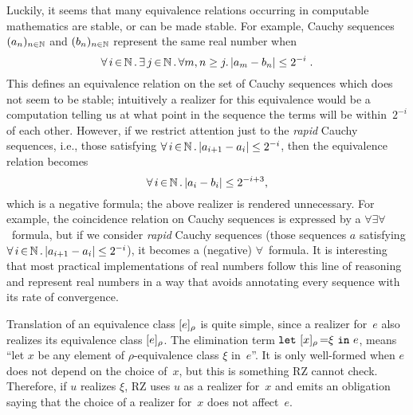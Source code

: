 Luckily, it seems that many equivalence relations occurring in
computable mathematics are stable, or can be made stable.
%
\iflong
For example, Cauchy sequences $(a_n)_{n\in\mathbb{N}}$
and $(b_n)_{n\in\mathbb{N}}$ represent the same real number when
%
\begin{equation}
  \label{eq:cauchy}%
  \xall{i}{\NN}{
    \xsome{j}{\NN}{
      \forall m,n \geq j.\,|a_m - b_n| \leq 2^{-i}
    }
  } \;.
\end{equation}
%
This defines an equivalence relation on the set of Cauchy sequences
which does not seem to be stable; intuitively a realizer for this
equivalence would be a computation telling us at what point
in the sequence the terms will be within~$2^{-i}$ of each other.
%
However, if we restrict attention just to the \emph{rapid} Cauchy
sequences, i.e., those satisfying $\forall\, i \,{\in}\, \mathbb{N}\,.\,|a_{i+1} - a_i| \leq
  2^{-i}$, then the equivalence relation becomes
%
\begin{equation*}
  \forall\, i \,{\in}\, \mathbb{N}\,.\,|a_i - b_i| \leq 2^{-i+3},
\end{equation*}
%
which is a negative formula; the above realizer is rendered
unnecessary.
%
\else %
%
For example, the coincidence relation on Cauchy sequences is expressed
by a $\forall\exists\forall$~formula, but if we consider \emph{rapid}
Cauchy sequences (those sequences $a$ satisfying
$\forall\, i \,{\in}\, \mathbb{N}\,.\,|a_{i+1} - a_i| \leq 2^{-i}$), it becomes a (negative)
$\forall$~formula.
%
\fi %
It is interesting that most practical implementations of
real numbers follow this line of reasoning and represent real numbers in a
way that avoids annotating every sequence with its rate of convergence.

Translation of an equivalence class $[e]_{\rho}$ is quite
simple, since a realizer for~$e$ also realizes its equivalence class
$[e]_{\rho}$. The elimination term
$\texttt{let}\ [x]_{\rho}\,{=}\xi\ \texttt{in}\ e$, means ``let $x$ be any element of
$\rho$-equivalence class $\xi$ in~$e$''. It is only well-formed when
$e$ does not depend on the choice of~$x$, but this is something RZ
cannot check. Therefore, if $u$ realizes $\xi$, RZ uses $u$ as a
realizer for~$x$ and emits an obligation saying that the choice of a
realizer for~$x$ does not affect~$e$.

